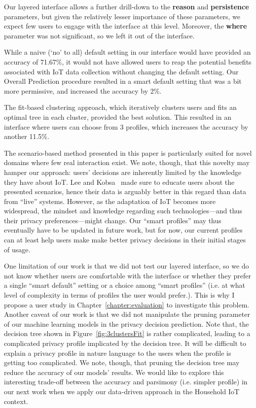 Our layered interface allows a further drill-down to the \textbf{reason} and \textbf{persistence} parameters, but given the relatively lesser importance of these parameters, we expect few users to engage with the interface at this level. Moreover, the \textbf{where} parameter was not significant, so we left it out of the interface.

While a naive (`no' to all) default setting in our interface would have provided an accuracy of 71.67\%, it would not have allowed users to reap the potential benefits associated with IoT data collection without changing the default setting. Our Overall Prediction procedure resulted in a smart default setting that was a bit more permissive, and increased the accuracy by 2\%.

The fit-based clustering approach, which iteratively clusters users and fits an optimal tree in each cluster, provided the best solution. This resulted in an interface where users can choose from 3 profiles, which increases the accuracy by another 11.5\%.

The scenario-based method presented in this paper is particularly suited for novel domains where few real interaction exist. We note, though, that this novelty may hamper our approach: users' decisions are inherently limited by the knowledge they have about IoT. Lee and Kobsa~\cite{lee2016understanding} made sure to educate users about the presented scenarios, hence their data is arguably better in this regard than data from ``live'' systems. However, as the adaptation of IoT becomes more widespread, the mindset and knowledge regarding such technologies---and thus their privacy preferences---might change. Our ``smart profiles'' may thus eventually have to be updated in future work, but for now, our current profiles can at least help users make make better privacy decisions in their initial stages of usage.

One limitation of our work is that we did not test our layered interface, so we do not know whether users are comfortable with the interface or whether they prefer a single ``smart default'' setting or a choice among ``smart profiles'' (i.e.  at what level of complexity in terms of profiles the user would prefer.). This is why I propose a user study in Chapter~\ref{chapter:evaluation} to investigate this problem. Another caveat of our work is that we did not manipulate the pruning parameter of our machine learning models in the privacy decision prediction. Note that, the decision tree shown in Figure~\ref{fig:3clustersFit} is rather complicated, leading to a complicated privacy profile implicated by the decision tree. It will be difficult to explain a privacy profile in nature language to the users when the profile is getting too complicated. We note, though, that pruning the decision tree may reduce the accuracy of our models' results. We would like to explore this interesting trade-off between the accuracy and parsimony (i.e. simpler profile) in our next work when we apply our data-driven approach in the Household IoT context. 

